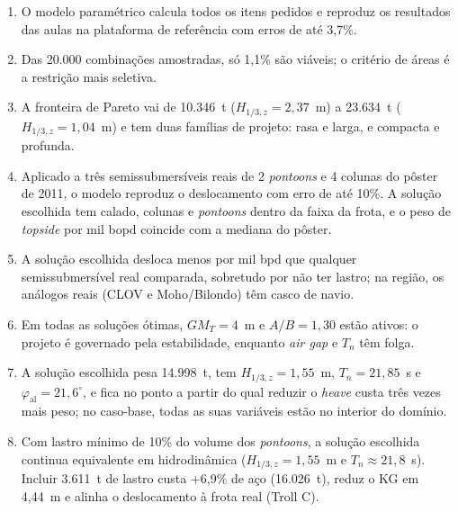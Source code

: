 \documentclass[11pt,a4paper]{article}
\newcommand{\phial}{\varphi_{\mathrm{al}}}
\newcommand{\Hz}{H_{1/3,z}}
\begin{document}
\begin{enumerate}
\item O modelo paramétrico calcula todos os itens pedidos e reproduz os resultados das aulas
na plataforma de referência com erros de até 3,7\%.
\item Das 20.000 combinações amostradas, só 1,1\% são viáveis; o critério de áreas é a
restrição mais seletiva.
\item A fronteira de Pareto vai de 10.346~t ($\Hz = 2{,}37$~m) a 23.634~t ($\Hz = 1{,}04$~m)
e tem duas famílias de projeto: rasa e larga, e compacta e profunda.
\item Aplicado a três semissubmersíveis reais de 2 \emph{pontoons} e 4 colunas do pôster de
2011, o modelo reproduz o deslocamento com erro de até 10\%. A solução escolhida tem calado,
colunas e \emph{pontoons} dentro da faixa da frota, e o peso de \emph{topside} por mil bopd
coincide com a mediana do pôster.
\item A solução escolhida desloca menos por mil bpd que qualquer semissubmersível real
comparada, sobretudo por não ter lastro; na região, os análogos reais (CLOV e Moho/Bilondo) têm
casco de navio.
\item Em todas as soluções ótimas, $GM_T = 4$~m e $A/B = 1{,}30$ estão ativos: o projeto é
governado pela estabilidade, enquanto \emph{air gap} e $T_n$ têm folga.
\item A solução escolhida pesa 14.998~t, tem $\Hz = 1{,}55$~m, $T_n = 21{,}85$~s e
$\phial = 21{,}6^\circ$, e fica no ponto a partir do qual reduzir o \emph{heave} custa três vezes
mais peso; no caso-base, todas as suas variáveis estão no interior do domínio.
\item Com lastro mínimo de 10\% do volume dos \emph{pontoons}, a solução escolhida continua
equivalente em hidrodinâmica ($\Hz = 1{,}55$~m e $T_n \approx 21{,}8$~s). Incluir 3.611~t de
lastro custa +6,9\% de aço (16.026~t), reduz o KG em 4,44~m e alinha o deslocamento à frota
real (Troll C).
\end{enumerate}
\end{document}
